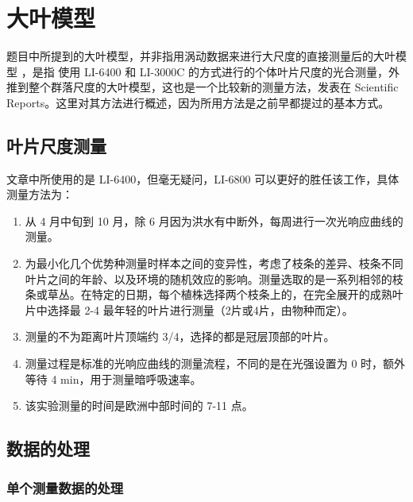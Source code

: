 \documentclass[
]{krantz}
\providecommand{\tightlist}{%
  \setlength{\itemsep}{0pt}\setlength{\parskip}{0pt}}
\begin{document}
\cleardoublepage

\hypertarget{big-leaf}{%
\chapter{大叶模型}\label{big-leaf}}

题目中所提到的大叶模型，并非指用涡动数据来进行大尺度的直接测量后的大叶模型 \citep{knauerBigleafPackageCalculation2018}，是指 \citet{mejdovaPhotosyntheticParametersSedgegrass2021} 使用 LI-6400 和 LI-3000C 的方式进行的个体叶片尺度的光合测量，外推到整个群落尺度的大叶模型，这也是一个比较新的测量方法，发表在 Scientific Reports。这里对其方法进行概述，因为所用方法是之前早都提过的基本方式。

\hypertarget{leaf-scale-meas}{%
\section{叶片尺度测量}\label{leaf-scale-meas}}

文章中所使用的是 LI-6400，但毫无疑问，LI-6800 可以更好的胜任该工作，具体测量方法为：

\begin{enumerate}
\def\labelenumi{\arabic{enumi}.}
\tightlist
\item
  从 4 月中旬到 10 月，除 6 月因为洪水有中断外，每周进行一次光响应曲线的测量。
\item
  为最小化几个优势种测量时样本之间的变异性，考虑了枝条的差异、枝条不同叶片之间的年龄、以及环境的随机效应的影响。测量选取的是一系列相邻的枝条或草丛。在特定的日期，每个植株选择两个枝条上的，在完全展开的成熟叶片中选择最 2-4 最年轻的叶片进行测量（2片或4片，由物种而定）。
\item
  测量的不为距离叶片顶端约 3/4，选择的都是冠层顶部的叶片。
\item
  测量过程是标准的光响应曲线的测量流程，不同的是在光强设置为 0 时，额外等待 4 min，用于测量暗呼吸速率。
\item
  该实验测量的时间是欧洲中部时间的 7-11 点。
\end{enumerate}

\hypertarget{big-leaf-data}{%
\section{数据的处理}\label{big-leaf-data}}

\hypertarget{single-data-big-leaf}{%
\subsection{单个测量数据的处理}\label{single-data-big-leaf}}
\end{document}
